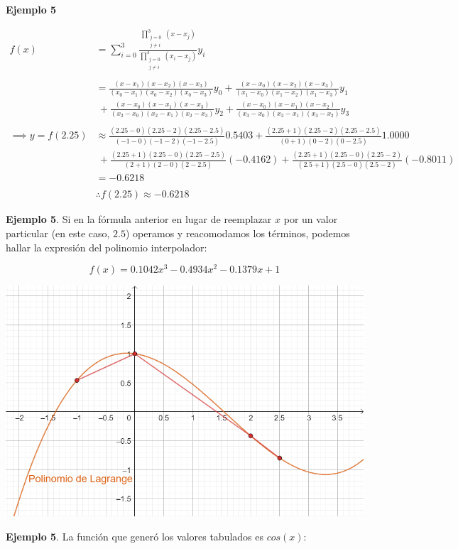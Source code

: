 \documentclass[]{book}
\begin{document}
\textbf{Ejemplo 5}

\[
\begin{split}
f(x) &= \sum_{i = 0}^3 \frac{\prod\limits_{\substack{j = 0\\ j \neq i}}^3 (x - x_j)}{\prod\limits_{\substack{j = 0\\ j \neq i}}^3 (x_i - x_j)} y_i \\ \\
&= \frac{(x - x_1)(x - x_2)(x - x_3)}{(x_0 - x_1)(x_0 - x_2)(x_0 - x_3)} y_0 + \frac{(x - x_0)(x - x_2)(x - x_3)}{(x_1 - x_0)(x_1 - x_2)(x_1 - x_3)} y_1 \\
&~ + \frac{(x - x_0)(x - x_1)(x - x_3)}{(x_2 - x_0)(x_2 - x_1)(x_2 - x_3)} y_2 + \frac{(x - x_0)(x - x_1)(x - x_2)}{(x_3 - x_0)(x_3 - x_1)(x_3 - x_2)} y_3 \\ \\
\implies y = f(2.25) &\approx \frac{(2.25 - 0)(2.25 - 2)(2.25 - 2.5)}{(-1-0)(-1-2)(-1-2.5)} 0.5403 + \frac{(2.25 +1)(2.25 - 2)(2.25 - 2.5)}{(0+1)(0-2)(0-2.5)} 1.0000 \\
&~ + \frac{(2.25 +1)(2.25 - 0)(2.25 - 2.5)}{(2+1)(2-0)(2-2.5)} (-0.4162) + \frac{(2.25 +1)(2.25 - 0)(2.25 - 2)}{(2.5+1)(2.5-0)(2.5-2)} (-0.8011) \\
&= -0.6218 \\ \\
&\therefore f(2.25) \approx -0.6218
\end{split}
\]

\textbf{Ejemplo 5}. Si en la fórmula anterior en lugar de reemplazar \(x\) por un valor particular (en este caso, \(2.5\)) operamos y reacomodamos los términos, podemos hallar la expresión del polinomio interpolador:

\[
f(x) = 0.1042 x^3 -0.4934 x^2 -0.1379 x+1
\]

\begin{center}\includegraphics[width=0.6\linewidth]{Plots/U4/lagrej2} \end{center}

\textbf{Ejemplo 5}. La función que generó los valores tabulados es \(cos(x)\):
\end{document}
